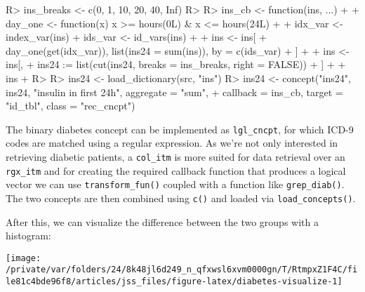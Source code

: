 \documentclass[
  notitle]{jss}
\begin{document}
\begin{CodeChunk}
\begin{CodeInput}
R> ins_breaks <- c(0, 1, 10, 20, 40, Inf)
R> 
R> ins_cb <- function(ins, ...) {
+ 
+   day_one <- function(x) x >= hours(0L) & x <= hours(24L)
+ 
+   idx_var <- index_var(ins)
+   ids_var <- id_vars(ins)
+ 
+   ins <- ins[
+     day_one(get(idx_var)), list(ins24 = sum(ins)), by = c(ids_var)
+   ]
+ 
+   ins <- ins[,
+     ins24 := list(cut(ins24, breaks = ins_breaks, right = FALSE))
+   ]
+ 
+   ins
+ }
R> 
R> ins24 <- load_dictionary(src, "ins")
R> ins24 <- concept("ins24", ins24, "insulin in first 24h", aggregate = "sum",
+                  callback = ins_cb, target = "id_tbl", class = "rec_cncpt")
\end{CodeInput}
\end{CodeChunk}

The binary diabetes concept can be implemented as \texttt{lgl\_cncpt},
for which ICD-9 codes are matched using a regular expression. As we're
not only interested in retrieving diabetic patients, a \texttt{col\_itm}
is more suited for data retrieval over an \texttt{rgx\_itm} and for
creating the required callback function that produces a logical vector
we can use \texttt{transform\_fun()} coupled with a function like
\texttt{grep\_diab()}. The two concepts are then combined using
\texttt{c()} and loaded via \texttt{load\_concepts()}.

\begin{CodeChunk}
\begin{CodeInput}
R> grep_diab <- function(x) grepl("^250\\.?[0-9]{2}$", x)
R> 
R> diab  <- item(src, table = "diagnoses_icd",
+               callback = transform_fun(grep_diab), class = "col_itm")
R> diab  <- concept("diab", diab, "diabetes", target = "id_tbl",
+                  class = "lgl_cncpt")
R> 
R> dat <- load_concepts(c(ins24, diab), id_type = "icustay", verbose = FALSE)
R> dat <- replace_na(dat, "[0,1)", vars = "ins24")
R> dat
\end{CodeInput}
\end{CodeChunk}

After this, we can visualize the difference between the two groups with
a histogram:

\begin{CodeChunk}


\begin{center}\texttt{[image: /private/var/folders/24/8k48jl6d249\_n\_qfxwsl6xvm0000gn/T/RtmpxZ1F4C/file81c4bde96f8/articles/jss\_files/figure-latex/diabetes-visualize-1]} \end{center}

\end{CodeChunk}
\end{document}
